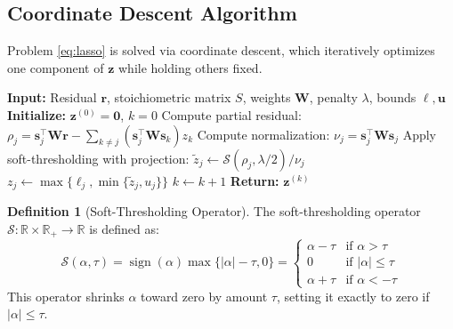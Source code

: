 \documentclass[12pt,a4paper]{article}
\theoremstyle{plain}
\theoremstyle{definition}
\newtheorem{definition}[theorem]{Definition}
\theoremstyle{remark}
\DeclareMathOperator{\sign}{sign}
\begin{document}
\subsection{Coordinate Descent Algorithm}

Problem \eqref{eq:lasso} is solved via coordinate descent, which iteratively optimizes one component of $\mathbf{z}$ while holding others fixed.

\begin{algorithm}
	\caption{Coordinate Descent for Bounded LASSO}\label{alg:coord_descent}
	\begin{algorithmic}[1]
		\State \textbf{Input:} Residual $\mathbf{r}$, stoichiometric matrix $S$, weights $\mathbf{W}$, penalty $\lambda$, bounds $\boldsymbol{\ell}, \mathbf{u}$
		\State \textbf{Initialize:} $\mathbf{z}^{(0)} = \mathbf{0}$, $k=0$
		\Repeat
		\State Compute partial residual: $\rho_j = \mathbf{s}_j^\top \mathbf{W} \mathbf{r} - \sum_{k \neq j} (\mathbf{s}_j^\top \mathbf{W} \mathbf{s}_k) z_k$
		\State Compute normalization: $\nu_j = \mathbf{s}_j^\top \mathbf{W} \mathbf{s}_j$
		\State Apply soft-thresholding with projection:
		\State $\tilde{z}_j \leftarrow \mathcal{S}(\rho_j, \lambda/2) / \nu_j$
		\State $z_j \leftarrow \max\{\ell_j, \min\{\tilde{z}_j, u_j\}\}$
		\EndFor
		\State $k \leftarrow k+1$
		\State \textbf{Return:} $\mathbf{z}^{(k)}$
	\end{algorithmic}
\end{algorithm}

\begin{definition}[Soft-Thresholding Operator]
	The soft-thresholding operator $\mathcal{S}: \mathbb{R} \times \mathbb{R}_+ \to \mathbb{R}$ is defined as:
	\begin{equation}\label{eq:soft_threshold}
		\mathcal{S}(\alpha, \tau) = \sign(\alpha) \max\{|\alpha| - \tau, 0\} = \begin{cases}
			\alpha - \tau & \text{if } \alpha > \tau      \\
			0             & \text{if } |\alpha| \leq \tau \\
			\alpha + \tau & \text{if } \alpha < -\tau
		\end{cases}
	\end{equation}
	This operator shrinks $\alpha$ toward zero by amount $\tau$, setting it exactly to zero if $|\alpha| \leq \tau$.
\end{definition}
\end{document}

